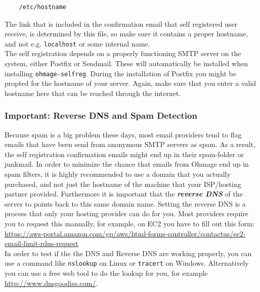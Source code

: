 \documentclass{scrartcl}
\begin{document}
\begin{verbatim}
    /etc/hostname
\end{verbatim}

\noindent The link that is included in the confirmation email that self
registered user receive, is determined by this file, so make sure it contains a
proper hostname, and not e.g. \texttt{localhost} or some internal name. \\

\noindent The self registration depends on a properly functioning
SMTP server on the system, either Postfix or Sendmail. These will automatically
be installed when installing \texttt{ohmage-selfreg}. During the installation of
Postfix you might be propted for the hostname of your server. Again, make sure
that you enter a valid hostname here that can be reached through the internet.

\subsubsection{Important: Reverse DNS and Spam Detection}

Because spam is a big problem these days, most email providers tend to flag
emails that have been send from anonymous SMTP servers as spam. As a result,
the self registration confirmation emails might end up in their spam-folder or
junkmail. In order to minimize the chance that emails from Ohmage end up in spam
filters, it is highly recommended to use a domain that you actually purchased,
and not just the hostname of the machine that your ISP/hosting partner provided.
Furthermore it is important that the \emph{\textbf{reverse DNS}} of the server
to points back to this same domain name. Setting the reverse DNS is a process
that only your hosting provider can do for you. Most providers require you to
request this manually, for example, on EC2 you have to fill out this form: \\

{\footnotesize\url{https://aws-portal.amazon.com/gp/aws/html-forms-controller/contactus/ec2-email-limit-rdns-request}}
\\



\noindent In order to test if the the DNS and Reverse DNS are working properly,
you can use a command like \texttt{nslookup} on Linux or \texttt{tracert} on
Windows. Alternatively you can use a free web tool to do the lookup for you,
for example \url{http://www.dnsgoodies.com/}.

 
\end{document}
